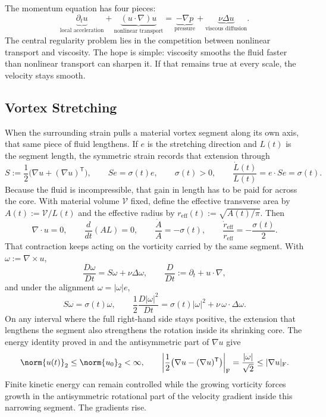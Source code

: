 
The momentum equation has four pieces:
\[
  \underbrace{\partial_t u}_{\text{local acceleration}}
  +
  \underbrace{(u\cdot\nabla)u}_{\text{nonlinear transport}}
  =
  \underbrace{-\nabla p}_{\text{pressure}}
  +
  \underbrace{\nu\Delta u}_{\text{viscous diffusion}}.
\]
The central regularity problem lies in the competition between nonlinear transport and viscosity.
The hope is simple: viscosity smooths the fluid faster than nonlinear transport can sharpen it.
If that remains true at every scale, the velocity stays smooth.

\subsection{Vortex Stretching}\label{sub:ThePerfectlyStretchingVortex}

When the surrounding strain pulls a material vortex segment along its own axis, that same piece of fluid lengthens. If \(e\) is the stretching direction and \(L(t)\) is the segment length, the symmetric strain records that extension through
\[
  S:=\frac12\bigl(\nabla u+(\nabla u)^{\mathsf T}\bigr),
  \qquad
  Se=\sigma(t)e,
  \qquad
  \sigma(t)>0,
  \qquad
  \frac{\dot L(t)}{L(t)}
  =
  e\cdot Se
  =
  \sigma(t).
\]
Because the fluid is incompressible, that gain in length has to be paid for across the core. With material volume \(\mathcal V\) fixed, define the effective transverse area by \(A(t):=\mathcal V/L(t)\) and the effective radius by \(r_{\mathrm{eff}}(t):=\sqrt{A(t)/\pi}\). Then
\[
  \nabla\cdot u=0,
  \qquad
  \frac{d}{dt}(A L)=0,
  \qquad
  \frac{\dot A}{A}=-\sigma(t),
  \qquad
  \frac{\dot r_{\mathrm{eff}}}{r_{\mathrm{eff}}}
  =
  -\frac{\sigma(t)}{2}.
\]
That contraction keeps acting on the vorticity carried by the same segment. With \(\omega:=\nabla\times u\),
\[
  \frac{D\omega}{Dt}
  =
  S\omega+\nu\Delta\omega,
  \qquad
  \frac{D}{Dt}
  :=
  \partial_t+u\cdot\nabla,
\]
and under the alignment \(\omega=|\omega|e\),
\[
  S\omega
  =
  \sigma(t)\omega,
  \qquad
  \frac12\frac{D|\omega|^2}{Dt}
  =
  \sigma(t)|\omega|^2
  +
  \nu\,\omega\cdot\Delta\omega.
\]
On any interval where the full right-hand side stays positive, the extension that lengthens the segment also strengthens the rotation inside its shrinking core. The energy identity proved in  and the antisymmetric part of \(\nabla u\) give
\[
  \norm{u(t)}_2
  \leq
  \norm{u_0}_2
  <\infty,
  \qquad
  \left|\frac12\bigl(\nabla u-(\nabla u)^{\mathsf T}\bigr)\right|_{\mathrm F}
  =
  \frac{|\omega|}{\sqrt2}
  \leq
  |\nabla u|_{\mathrm F}.
\]
Finite kinetic energy can remain controlled while the growing vorticity forces growth in the antisymmetric rotational part of the velocity gradient inside this narrowing segment. The gradients rise.

